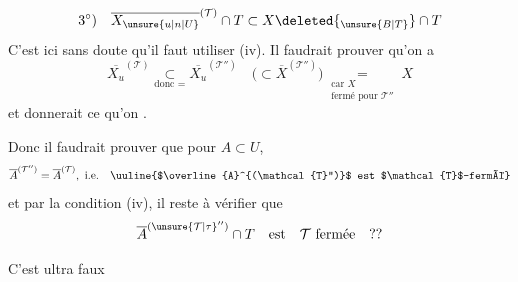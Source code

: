 \[
3^\circ)\quad\overline{X_{\unsure{u|n|U}}}^{(\mathcal{T})}\cap T\subset X\deleted{_{\unsure{B|T}}}\cap T
\]
C'est ici sans doute qu'il faut utiliser (iv). Il faudrait prouver qu'on a
\[
\overline{X_u}^{(\mathcal{T})}\underset{\text{donc }=}{\subset}\overline{X_u}^{(\mathcal{T}'')}
\quad\bigl(\subset\overline{X}^{(\mathcal{T}'')}\bigr)
\underset{\substack{\text{car }X\\\text{fermé pour }\mathcal{T}''}}{=}X
\]
et  donnerait ce qu'on .

Donc il faudrait prouver que pour $A\subset U$,
\[
\overline{A}^{(\mathcal{T}'')}=\overline{A}^{(\mathcal{T})},\ \text{i.e.}\quad
\text{\uuline{$\overline{A}^{(\mathcal{T}'')}$ est $\mathcal{T}$-fermé}}
\]
et par la condition (iv), il reste à vérifier que
\[
\overline{A}^{({\unsure{\mathcal{T}|\tau}}'')}\cap T\quad\text{est}\quad\mathcal{T}\text{ fermée}\quad ??
\]

C'est ultra faux 

